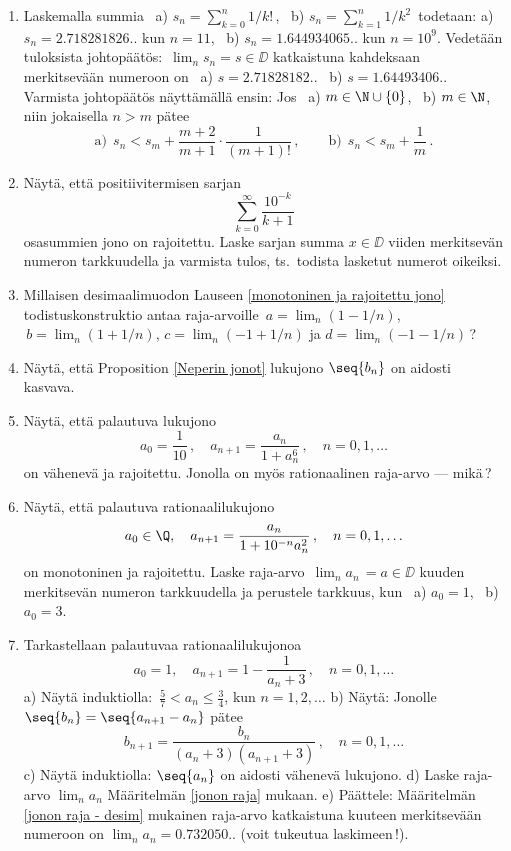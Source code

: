 \Harj
\begin{enumerate}


\item \label{H-I-8: kaksi sarjaa}
Laskemalla summia \ a) $s_n=\sum_{k=0}^n 1/k!\,$, \ b) $s_n=\sum_{k=1}^n 1/k^2\,$ todetaan:
\newline
a) $s_n=2.718281826..$ kun $n=11$, \ b) $s_n=1.644934065..$ kun $n=10^9$.
Vedetään tuloksista johtopäätös: $\,\lim_n s_n=s\in\DD$ katkaistuna kahdeksaan merkitsevään
numeroon on \ a) $s=2.71828182..$ \ b) $s=1.64493406..$ \newline 
Varmista johtopäätös näyttämällä ensin: Jos \ a) $m\in\N\cup\{0\}$, \ b) $m\in\N$, niin
jokaisella $n>m$ pätee
\[
\text{a)}\ \ s_n < s_m + \frac{m+2}{m+1}\cdot\frac{1}{(m+1)!}\,, \qquad
\text{b)}\ \ s_n < s_m + \frac{1}{m}\,.
\]

\item
Näytä, että positiivitermisen sarjan
\[
\sum_{k=0}^\infty \frac{10^{-k}}{k+1}
\]
osasummien jono on rajoitettu. Laske sarjan summa $x\in\DD$ viiden merkitsevän numeron 
tarkkuudella ja varmista tulos, ts.\ todista lasketut numerot oikeiksi.

\item
Millaisen desimaalimuodon Lauseen \ref{monotoninen ja rajoitettu jono} todistuskonstruktio
antaa raja-arvoille $\,a=\lim_n (1-1/n)$, $\,b=\lim_n (1+1/n)$, $c=\lim_n (-1+1/n)$ ja
$d=\lim_n (-1-1/n)\,$?

\item \label{H-I-8: Neperin jono}
Näytä, että Proposition \ref{Neperin jonot} lukujono $\seq{b_n}$ on aidosti kasvava.

\item
Näytä, että palautuva lukujono
\[
a_0 = \frac{1}{10}\,, \quad \displaystyle{a_{n+1} = \frac{a_n}{1+a_n^6}\,, \quad n=0,1, \ldots}
\]
on vähenevä ja rajoitettu. Jonolla on myös rationaalinen raja-arvo --- mikä\,?

\item
Näytä, että palautuva rationaalilukujono
\[
a_0\in\Q, \quad a_{n+1}=\frac{a_n}{1+10^{-n}a_n^2}\,,\quad n=0,1, \ldots
\]
on monotoninen ja rajoitettu. Laske raja-arvo $\,\lim_n a_n\, = a\in\DD$ kuuden 
merkitsevän numeron tarkkuudella ja perustele tarkkuus, kun \ a) $a_0=1$, \ b) $a_0=3$. 

\pagebreak

\item
Tarkastellaan palautuvaa rationaalilukujonoa
\[
a_0=1, \quad a_{n+1} = 1-\frac{1}{a_n+3}\,, \quad n=0,1,\ldots
\]
a) Näytä induktiolla: $\,\tfrac{5}{7} < a_n \le \tfrac{3}{4}$, kun $n=1,2,\ldots$ \newline
b) Näytä: Jonolle $\seq{b_n}=\seq{a_{n+1}-a_n}$ pätee
\[
b_{n+1} = \frac{b_n}{(a_n+3)(a_{n+1}+3)}\,, \quad n=0,1,\ldots
\]
c) Näytä induktiolla: $\seq{a_n}$ on aidosti vähenevä lukujono. \newline
d) Laske raja-arvo $\lim_n a_n$ Määritelmän \ref{jonon raja} mukaan. \newline
e) Päättele: Määritelmän \ref{jonon raja - desim} mukainen raja-arvo katkaistuna kuuteen
merkitsevään numeroon on $\lim_n a_n = 0.732050..$ (voit tukeutua laskimeen\,!). 


\end{enumerate}
